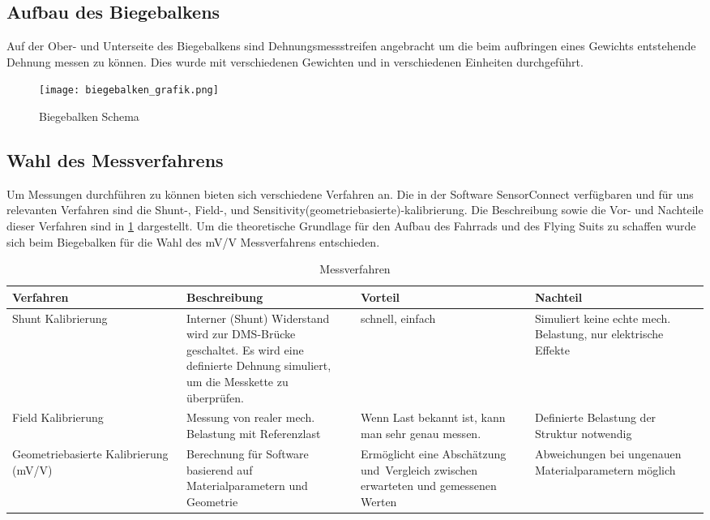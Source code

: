 \subsection{Aufbau des Biegebalkens}
Auf der Ober- und Unterseite des Biegebalkens sind Dehnungsmessstreifen angebracht um die beim aufbringen eines Gewichts entstehende Dehnung messen zu können.
Dies wurde mit verschiedenen Gewichten und in verschiedenen Einheiten durchgeführt.
\begin{figure}[h]
    \begin{center}
        \texttt{[image: biegebalken\_grafik.png]}
        \caption[Biegebalken Schema (Abbildungsverzeichnis)]{Biegebalken Schema
        }
        \label{fig:biegebalkenschema}
    \end{center}
\end{figure}

\subsection{Wahl des Messverfahrens}
Um Messungen durchführen zu können bieten sich verschiedene Verfahren an.
Die in der Software SensorConnect verfügbaren und für uns relevanten Verfahren sind die Shunt-, Field-, und Sensitivity(geometriebasierte)-kalibrierung.
Die Beschreibung sowie die Vor- und Nachteile dieser Verfahren sind in \ref{tbl:verfahren}  dargestellt.
Um die theoretische Grundlage für den Aufbau des Fahrrads und des Flying Suits zu schaffen wurde sich beim Biegebalken für die Wahl des mV/V Messverfahrens entschieden.

\bgroup
\def\arraystretch{2}
\begin{table}[h]
\centering
\begin{tabular}{|p{0.25\linewidth}|p{0.25\linewidth}|p{0.25\linewidth}|p{0.25\linewidth}|}
\hline
Verfahren & Beschreibung & Vorteil & Nachteil\\ \hline
Shunt Kalibrierung & Interner (Shunt) Widerstand wird zur DMS-Brücke geschaltet. Es wird eine definierte Dehnung simuliert, um die Messkette zu überprüfen.
& schnell, einfach & Simuliert keine echte mech. Belastung, nur elektrische Effekte
\\ \hline
Field Kalibrierung & Messung von realer mech. Belastung mit Referenzlast

& Wenn Last bekannt ist, kann man sehr genau messen.
& Definierte Belastung der Struktur notwendig

\\ \hline
Geometriebasierte Kalibrierung (mV/V)
 & Berechnung für Software basierend auf Materialparametern und Geometrie


& Ermöglicht eine Abschätzung und Vergleich zwischen erwarteten und gemessenen Werten

& Abweichungen bei ungenauen Materialparametern möglich


\\ \hline

\end{tabular}
\caption{Messverfahren}
\label{tbl:verfahren}

\end{table}
\egroup


